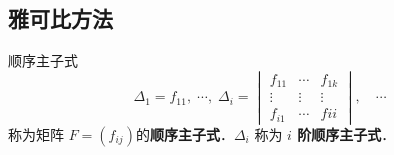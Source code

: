 \subsection{雅可比方法}
\begin{definition}{顺序主子式}
\begin{equation}
\Delta_1=f_{11},\;\cdots,\;\Delta_i=\begin{vmatrix}
f_{11}&\cdots&f_{1k}\\
\vdots&\vdots&\vdots\\
f_{i1}&\cdots&f{ii}
\end{vmatrix},\quad
\cdots
\end{equation}
称为矩阵 $F=(f_{ij})$的\textbf{顺序主子式}．$\Delta_i$ 称为\textbf{ $i$ 阶顺序主子式}．
\end{definition}